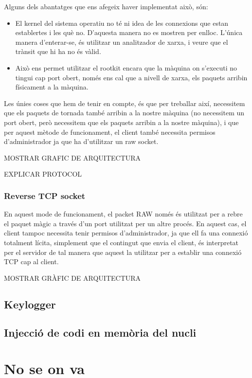 Alguns dels abantatges que ens afegeix haver implementat això, són:
\begin{itemize}
\item El kernel del sistema operatiu no té ni idea de les connexions que estan establertes i les què no. D'aquesta manera no es mostren per
enlloc. L'única manera d'enterar-se, és utilitzar un analitzador de xarxa, i veure que el trànsit que hi ha no és vàlid.
\item Això ens permet utilitzar el rootkit encara que la màquina on s'executi no tingui cap port obert, només ens cal que a nivell de xarxa, 
els paquets arribin físicament a la màquina.
\end{itemize}

Les únies coses que hem de tenir en compte, és que per treballar així, necessitem que els paquets de tornada també arribin a la nostre màquina 
(no necessitem un port obert, però necessitem que els paquets arribin a la nostre màquina), i que per aquest mètode de funcionament, el client 
també necessita permisos d'administrador ja que ha d'utilitzar un raw socket.

MOSTRAR GRAFIC DE ARQUITECTURA

EXPLICAR PROTOCOL


\subsubsection{Reverse TCP socket}
En aquest mode de funcionament, el packet RAW només és utilitzat per a rebre el paquet màgic a través d'un port utilitzat per un altre procés. En aquest 
cas, el client tampoc necessita tenir permisos d'administrador, ja que ell fa una connexió totalment lícita, simplement que el contingut que envia
el client, és interpretat per el servidor de tal manera que aquest la utilitzar per a establir una connexió TCP cap al client.

MOSTRAR GRÀFIC DE ARQUITECTURA

\subsection{Keylogger}
\subsection{Injecció de codi en memòria del nucli}




\section{No se on va}
